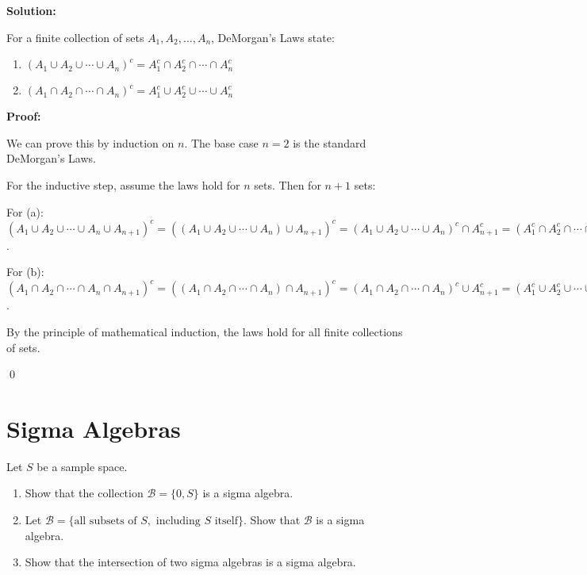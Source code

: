 \noindent\textbf{Solution:}

For a finite collection of sets $A_1, A_2, \ldots, A_n$, DeMorgan's Laws state:
\begin{enumerate}[label=(\alph*)]
    \item $(A_1 \cup A_2 \cup \cdots \cup A_n)^c = A_1^c \cap A_2^c \cap \cdots \cap A_n^c$
    \item $(A_1 \cap A_2 \cap \cdots \cap A_n)^c = A_1^c \cup A_2^c \cup \cdots \cup A_n^c$
\end{enumerate}

\textbf{Proof:}

We can prove this by induction on $n$. The base case $n = 2$ is the standard DeMorgan's Laws.

For the inductive step, assume the laws hold for $n$ sets. Then for $n + 1$ sets:

For (a): $(A_1 \cup A_2 \cup \cdots \cup A_n \cup A_{n+1})^c = ((A_1 \cup A_2 \cup \cdots \cup A_n) \cup A_{n+1})^c = (A_1 \cup A_2 \cup \cdots \cup A_n)^c \cap A_{n+1}^c = (A_1^c \cap A_2^c \cap \cdots \cap A_n^c) \cap A_{n+1}^c = A_1^c \cap A_2^c \cap \cdots \cap A_n^c \cap A_{n+1}^c$.

For (b): $(A_1 \cap A_2 \cap \cdots \cap A_n \cap A_{n+1})^c = ((A_1 \cap A_2 \cap \cdots \cap A_n) \cap A_{n+1})^c = (A_1 \cap A_2 \cap \cdots \cap A_n)^c \cup A_{n+1}^c = (A_1^c \cup A_2^c \cup \cdots \cup A_n^c) \cup A_{n+1}^c = A_1^c \cup A_2^c \cup \cdots \cup A_n^c \cup A_{n+1}^c$.

By the principle of mathematical induction, the laws hold for all finite collections of sets.



\qed
\section{Sigma Algebras}

\begin{problembox}
Let $S$ be a sample space.
\begin{enumerate}[label=(\alph*)]
    \item Show that the collection $\mathcal{B} = \{0, S\}$ is a sigma algebra.
    \item Let $\mathcal{B} = \{\text{all subsets of } S, \text{ including } S \text{ itself}\}$. Show that $\mathcal{B}$ is a sigma algebra.
    \item Show that the intersection of two sigma algebras is a sigma algebra.
\end{enumerate}
\end{problembox}

